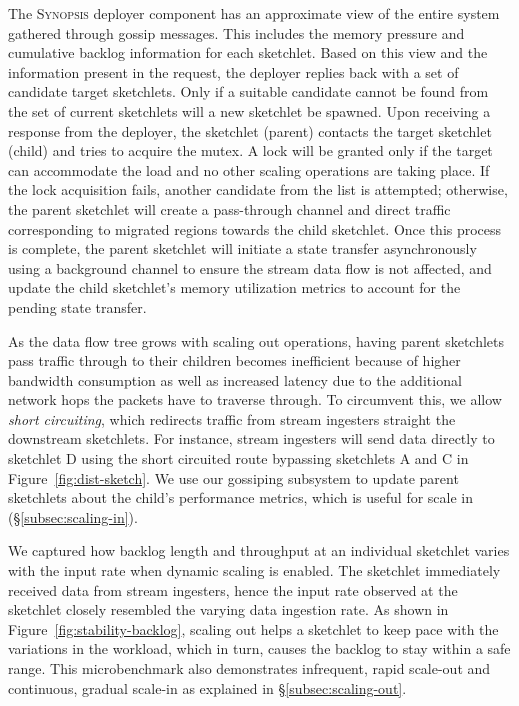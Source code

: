 %
The \textsc{Synopsis} deployer component has an approximate view of the entire system gathered through gossip messages. This includes the memory pressure and cumulative backlog information for each sketchlet.
Based on this view and the information present in the request, the deployer replies back with a set of candidate target sketchlets.
Only if a suitable candidate cannot be found from the set of current sketchlets will a new sketchlet be spawned.
Upon receiving a response from the deployer, the sketchlet (parent) contacts the target sketchlet (child) and tries to acquire the mutex.
A lock will be granted only if the target can accommodate the load and no other scaling operations are taking place.
If the lock acquisition fails, another candidate from the list is attempted; otherwise, the parent sketchlet will create a pass-through channel and direct traffic corresponding to migrated regions towards the child sketchlet.
Once this process is complete, the parent sketchlet will initiate a state transfer asynchronously using a background channel to ensure the stream data flow is not affected, and update the child sketchlet's memory utilization metrics to account for the pending state transfer.

As the data flow tree grows with scaling out operations, having parent sketchlets pass traffic through to their children becomes inefficient because of higher bandwidth consumption as well as increased latency due to the additional network hops the packets have to traverse through.
To circumvent this, we allow \emph{short circuiting}, which redirects traffic from stream ingesters straight the downstream sketchlets.
For instance, stream ingesters will send data directly to sketchlet D using the short circuited route bypassing sketchlets A and C in Figure~\ref{fig:dist-sketch}. 
We use our gossiping subsystem to update parent sketchlets about the child's performance metrics, which is useful for scale in (\S\ref{subsec:scaling-in}).

We captured how backlog length and throughput at an individual sketchlet varies with the input rate when dynamic scaling is enabled.
The sketchlet immediately received data from stream ingesters, hence the input rate observed at the sketchlet closely resembled the varying data ingestion rate.
As shown in Figure~\ref{fig:stability-backlog}, scaling out helps a sketchlet to keep pace with the variations in the workload, which in turn, causes the backlog to stay within a safe range.
This microbenchmark also demonstrates infrequent, rapid scale-out and continuous, gradual scale-in as explained in \S\ref{subsec:scaling-out}.

